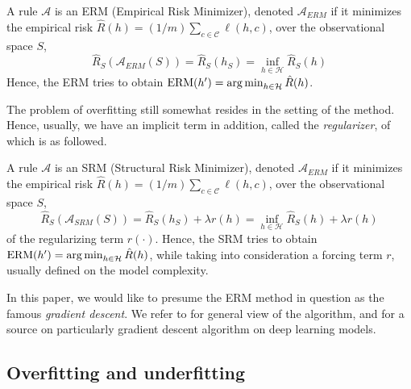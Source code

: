 \documentclass[10pt]{article} %
\begin{document}
\begin{definition}
    A rule $\mathcal{A}$ is an ERM (Empirical Risk Minimizer), denoted $\mathcal{A}_{ERM}$ if it minimizes the empirical risk $\hat{R}(h)=(1/m)\sum_{c\in\mathcal{C}}\ell(h,c)$, over the observational space $S$, 
    \begin{equation}
        \hat{R}_{S}(\mathcal{A}_{ERM}(S)) = \hat{R}_{S} (h_{S}) = \inf_{h\in\mathcal{H}} \hat{R}_{S}(h) 
    \end{equation}
    Hence, the ERM tries to obtain $\mathrm{ERM}(h') = \operatorname*{arg\,min}_{h\in \mathcal{H}} \hat{R}(h)$. 
\end{definition}

The problem of overfitting still somewhat resides in the setting of the method. Hence, usually, we have an implicit term in addition, called the \textit{regularizer}, of which is as followed. 

\begin{definition}
    A rule $\mathcal{A}$ is an SRM (Structural Risk Minimizer), denoted $\mathcal{A}_{ERM}$ if it minimizes the empirical risk $\hat{R}(h)=(1/m)\sum_{c\in\mathcal{C}}\ell(h,c)$, over the observational space $S$, 
    \begin{equation}
        \hat{R}_{S}(\mathcal{A}_{SRM}(S)) = \hat{R}_{S} (h_{S}) + \lambda r(h)= \inf_{h\in\mathcal{H}} \hat{R}_{S}(h) + \lambda r(h)
    \end{equation}
    of the regularizing term $r(\cdot)$. Hence, the SRM tries to obtain $\mathrm{ERM}(h') = \operatorname*{arg\,min}_{h\in \mathcal{H}} \hat{R}(h)$, while taking into consideration a forcing term $r$, usually defined on the model complexity. 
\end{definition}

In this paper, we would like to presume the ERM method in question as the famous \textit{gradient descent}. We refer to \cite{achlioptas_stochastic_nodate,ruder_overview_2017} for general view of the algorithm, and \cite{zhang_gradient_2019} for a source on particularly gradient descent algorithm on deep learning models. 

\subsection{Overfitting and underfitting}
\end{document}
